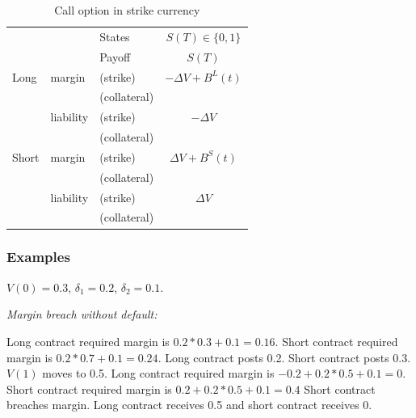 \documentclass[12pt]{article}
\begin{document}
\begin{table}
\centering
\begin{tabular}{lll|c}
\hline
&  & States & $S(T) \in \{0,1\}$ \\
&  & Payoff &  $S(T)$\\
Long      & margin    & (strike)     & $-\Delta V + B^L(t)$  \\
          &           & (collateral) &\\
          & liability & (strike)     & $-\Delta V$\\
          &           & (collateral)&\\
Short     & margin    & (strike)     & $\Delta V + B^S(t)$ \\
          &           & (collateral) &\\
          & liability & (strike)     & $\Delta V$\\
          &           & (collateral) &\\          
\hline
\end{tabular}
\caption{Call option in strike currency}
\label{tab:eventstrike}
\end{table}

\subsubsection*{Examples}

$V(0)=0.3$, $\delta_1=0.2$, $\delta_2=0.1$. 


\textit{Margin breach without default:}


Long contract required margin is $0.2*0.3 +0.1 = 0.16$. Short contract required margin is $0.2*0.7 +0.1 = 0.24$. Long contract posts 0.2. Short contract posts 0.3. $V(1)$ moves to 0.5. Long contract required margin is $-0.2+0.2*0.5 + 0.1 = 0$. Short contract required margin is $0.2+0.2*0.5 + 0.1 = 0.4$
Short contract breaches margin. Long contract receives 0.5 and short contract receives $0$.
\end{document}
